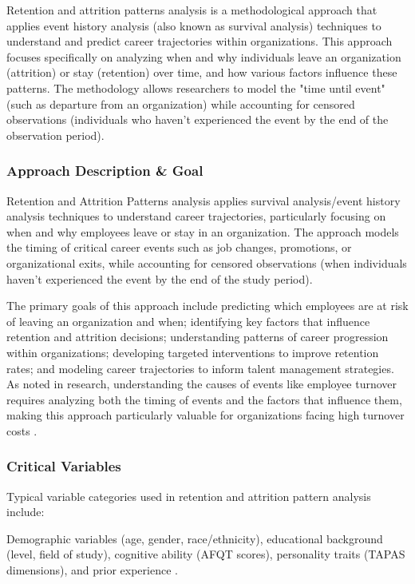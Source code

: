 \documentclass[../main.tex]{subfiles}
\begin{document}
Retention and attrition patterns analysis is a methodological approach that applies event history analysis (also known as survival analysis) techniques to understand and predict career trajectories within organizations. This approach focuses specifically on analyzing when and why individuals leave an organization (attrition) or stay (retention) over time, and how various factors influence these patterns. The methodology allows researchers to model the "time until event" (such as departure from an organization) while accounting for censored observations (individuals who haven't experienced the event by the end of the observation period).

\subsubsection{Approach Description \& Goal}

Retention and Attrition Patterns analysis applies survival analysis/event history analysis techniques to understand career trajectories, particularly focusing on when and why employees leave or stay in an organization. The approach models the timing of critical career events such as job changes, promotions, or organizational exits, while accounting for censored observations (when individuals haven't experienced the event by the end of the study period).

The primary goals of this approach include predicting which employees are at risk of leaving an organization and when; identifying key factors that influence retention and attrition decisions; understanding patterns of career progression within organizations; developing targeted interventions to improve retention rates; and modeling career trajectories to inform talent management strategies. As noted in research, understanding the causes of events like employee turnover requires analyzing both the timing of events and the factors that influence them, making this approach particularly valuable for organizations facing high turnover costs \citep{allison1982discrete, maas2003use}.

\subsubsection{Critical Variables}

Typical variable categories used in retention and attrition pattern analysis include:

Demographic variables (age, gender, race/ethnicity), educational background (level, field of study), cognitive ability (AFQT scores), personality traits (TAPAS dimensions), and prior experience \citep{niessen2016attrition}.
\end{document}
